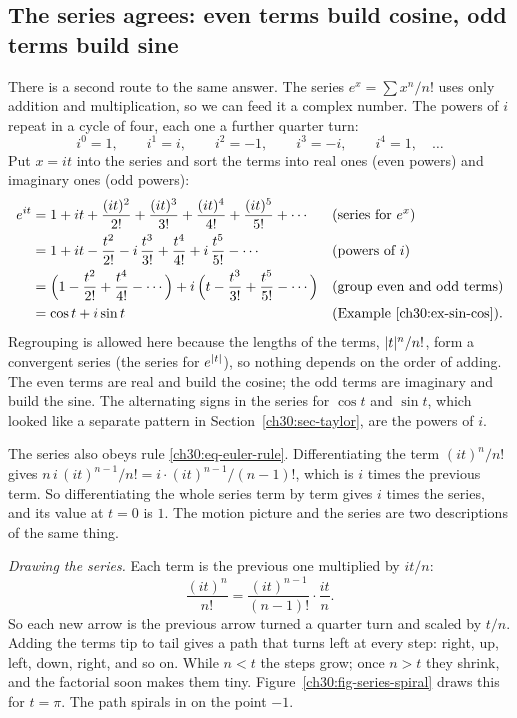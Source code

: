 \subsection{The series agrees: even terms build cosine, odd terms build sine}
\label{ch30:sec-euler-series}

There is a second route to the same answer. The series $e^x = \sum x^n/n!$ uses only addition and multiplication, so we can feed it a complex number. The powers of $i$ repeat in a cycle of four, each one a further quarter turn:
\[
  i^0 = 1, \qquad i^1 = i, \qquad i^2 = -1, \qquad i^3 = -i, \qquad i^4 = 1, \quad \dots
\]
Put $x = it$ into the series and sort the terms into real ones (even powers) and imaginary ones (odd powers):
\begin{align*}
  e^{it} &= 1 + it + \frac{(it)^2}{2!} + \frac{(it)^3}{3!} + \frac{(it)^4}{4!} + \frac{(it)^5}{5!} + \cdots
     && \text{(series for $e^x$)}\\
  &= 1 + it - \frac{t^2}{2!} - i\,\frac{t^3}{3!} + \frac{t^4}{4!} + i\,\frac{t^5}{5!} - \cdots
     && \text{(powers of $i$)}\\
  &= \Bigl(1 - \frac{t^2}{2!} + \frac{t^4}{4!} - \cdots\Bigr) + i\,\Bigl(t - \frac{t^3}{3!} + \frac{t^5}{5!} - \cdots\Bigr)
     && \text{(group even and odd terms)}\\
  &= \cos t + i\sin t
     && \text{(Example~\ref{ch30:ex-sin-cos})}.
\end{align*}
Regrouping is allowed here because the lengths of the terms, $\lvert t\rvert^n/n!$, form a convergent series (the series for $e^{\lvert t\rvert}$), so nothing depends on the order of adding. The even terms are real and build the cosine; the odd terms are imaginary and build the sine. The alternating signs in the series for $\cos t$ and $\sin t$, which looked like a separate pattern in Section~\ref{ch30:sec-taylor}, are the powers of $i$.

The series also obeys rule \eqref{ch30:eq-euler-rule}. Differentiating the term $(it)^n/n!$ gives $n\,i\,(it)^{n-1}/n! = i\cdot (it)^{n-1}/(n-1)!$, which is $i$ times the previous term. So differentiating the whole series term by term gives $i$ times the series, and its value at $t=0$ is $1$. The motion picture and the series are two descriptions of the same thing.

\emph{Drawing the series.} Each term is the previous one multiplied by $it/n$:
\[
  \frac{(it)^n}{n!} = \frac{(it)^{n-1}}{(n-1)!}\cdot\frac{it}{n}.
\]
So each new arrow is the previous arrow turned a quarter turn and scaled by $t/n$. Adding the terms tip to tail gives a path that turns left at every step: right, up, left, down, right, and so on. While $n < t$ the steps grow; once $n > t$ they shrink, and the factorial soon makes them tiny. Figure~\ref{ch30:fig-series-spiral} draws this for $t = \pi$. The path spirals in on the point $-1$.

